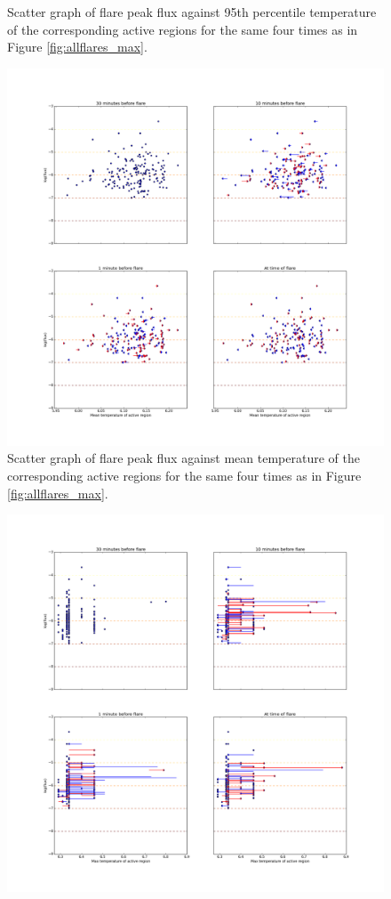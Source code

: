\documentclass[referee,a4paper,12pt,traditabstract]{swsc}
\begin{document}
\begin{linenumbers}
\begin{figure}
	\caption{Scatter graph of flare peak flux against 95th percentile temperature of the corresponding active regions for the same four times as in Figure \ref{fig:allflares_max}.}
	\label{fig:allflares_p95}
\end{figure}
\begin{figure}
	\centering
		\includegraphics[width=0.9\columnwidth]{tempplotsmean/allflares.png}
	\caption{Scatter graph of flare peak flux against mean temperature of the corresponding active regions for the same four times as in Figure \ref{fig:allflares_max}.}
	\label{fig:allflares_mean}
\end{figure}
\begin{figure}
	\centering
		\includegraphics[width=0.9\columnwidth]{tempplotsmax/allflares.png}

\end{figure}
\end{linenumbers}
\end{document}

